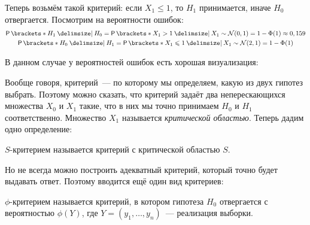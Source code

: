 Теперь возьмём такой критерий: если \(X_{1} \leq 1\), то \(H_{1}\) принимается, 
иначе \(H_{0}\) отвергается. Посмотрим на вероятности ошибок:
\begin{gather*}
	\Pr{H_{1} \given H_{0}} = \Pr{X_{1} > 1 \given X_{1} \sim \mathcal{N}(0, 
	1)} = 1 - \Phi(1) \approx 0,159 \\
	\Pr{H_{0} \given H_{1}} = \Pr{X_{1} \leq 1 \given X_{1} \sim \mathcal{N}(2, 
	1)} = 1 - \Phi(1)
\end{gather*}

В данном случае у вероятностей ошибок есть хорошая визуализация:
\begin{center}
\end{center}

Вообще говоря, критерий~--- по которому мы определяем, какую из двух гипотез 
выбрать. Поэтому можно сказать, что критерий задаёт два неперескающихся 
множества \(X_{0}\) и \(X_{1}\) такие, что в них мы точно принимаем \(H_{0}\) и 
\(H_{1}\) соответственно. Множество \(X_{1}\) называется \emph{критической 
областью}. Теперь дадим одно определение:
\begin{definition}
	\(S\)-критерием называется критерий с критической областью \(S\).
\end{definition}

Но не всегда можно построить адекватный критерий, который точно будет выдавать 
ответ. Поэтому вводится ещё один вид критериев:
\begin{definition}
	\(\phi\)-критерием называется критерий, в котором гипотеза \(H_{0}\) 
	отвергается с вероятностью \(\phi(Y)\), где \(Y = (y_{1}, \dots, 
	y_{n})\)~--- реализация выборки.
\end{definition}

